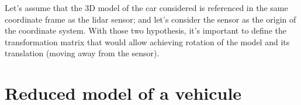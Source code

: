 \documentclass{scrartcl}
\begin{document}
    Let's assume that the 3D model of the car considered is referenced in
    the same coordinate frame as the lidar sensor; and let's consider the
    sensor as the origin of the coordinate system. With those two hypothesis,
    it's important to define the transformation matrix that would allow
    achieving rotation of the model and its translation (moving away from the
    sensor).

  \section{Reduced model of a vehicule}

  \printbibliography
\end{document}
